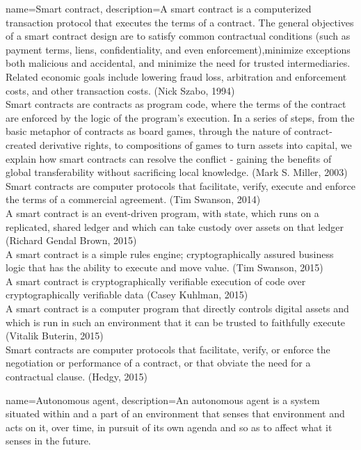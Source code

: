 \documentclass[a4paper, 12pt]{scrartcl}
\begin{document}
{
  name={Smart contract},
  description={A smart contract is a computerized transaction protocol that executes the terms of a contract. The general objectives of a smart contract design are to satisfy common contractual conditions (such as payment terms, liens, confidentiality, and even enforcement),minimize exceptions both malicious and accidental, and minimize the need for trusted intermediaries. Related economic goals include lowering fraud loss, arbitration and enforcement costs, and other transaction costs. (Nick Szabo, 1994)\\

  Smart contracts are contracts as program code, where the terms of the contract are enforced by the logic of the program's execution. In a series of steps, from the basic metaphor of contracts as board games, through the nature of contract-created derivative rights, to compositions of games to turn assets into capital, we explain how smart contracts can resolve the conflict - gaining the benefits of global transferability without sacrificing local knowledge. (Mark S. Miller, 2003) \\

  Smart contracts are computer protocols that facilitate, verify, execute and enforce the terms of a commercial agreement. (Tim Swanson, 2014) \\

  A smart contract is an event-driven program, with state, which runs on a replicated, shared ledger and which can take custody over assets on that ledger (Richard Gendal Brown, 2015)\\

  A smart contract is a simple rules engine; cryptographically assured business logic that has the ability to execute and move value. (Tim Swanson, 2015)\\

  A smart contract is cryptographically verifiable execution of code over cryptographically verifiable data (Casey Kuhlman, 2015)\\

  A smart contract is a computer program that directly controls digital assets and which is run in such an environment that it can be trusted to faithfully execute (Vitalik Buterin, 2015)\\

  Smart contracts are computer protocols that facilitate, verify, or enforce the negotiation or performance of a contract, or that obviate the need for a contractual clause. (Hedgy, 2015)}
}

 {
	name={Autonomous agent},
	description={An autonomous agent is a system situated within and a part of an environment that senses that environment and acts on it, over time, in pursuit of its own agenda and so as to affect what it senses in the future. }
}
\printglossaries
\end{document}
